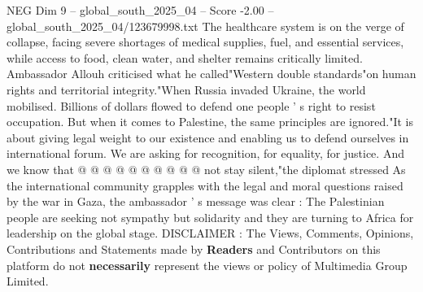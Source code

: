 \begin{textsample}{NEG Dim 9 – global\_south\_2025\_04 – Score -2.00 – global\_south\_2025\_04/123679998.txt}
The healthcare system is on the verge of collapse, facing severe shortages of medical supplies, fuel, and essential services, while access to food, clean water, and shelter remains critically limited.
Ambassador Allouh criticised what he called"Western double standards"on human rights and territorial integrity."When Russia invaded Ukraine, the world mobilised.
Billions of dollars flowed to defend one people ' s right to resist occupation.
But when it comes to Palestine, the same principles are ignored."It is about giving legal weight to our existence and enabling us to defend ourselves in international forum.
We are asking for recognition, for equality, for justice.
And we know that @ @ @ @ @ @ @ @ @ @ not stay silent,"the diplomat stressed As the international community grapples with the legal and moral questions raised by the war in Gaza, the ambassador ' s message was clear : The Palestinian people are seeking not sympathy but solidarity and they are turning to Africa for leadership on the global stage.
DISCLAIMER : The Views, Comments, Opinions, Contributions and Statements made by \textbf{Readers} and Contributors on this platform do not \textbf{necessarily} represent the views or policy of Multimedia Group Limited.

\end{textsample}
